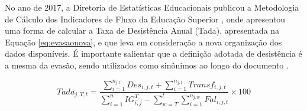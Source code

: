 \documentclass[a4paper]{article}
\begin{document}




No ano de 2017, a Diretoria de Estatísticas Educacionais publicou a Metodologia de Cálculo
dos Indicadores de Fluxo da Educação Superior , onde apresentou uma  forma de calcular a Taxa de Desistência Anual (Tada), apresentada na Equação \ref{eq:evasaonova}, e que leva em consideração a nova organização dos dados disponíveis. É importante salientar que a definição adotada de desistência é a mesma da evasão, sendo utilizados como sinônimos ao longo do documento \cite{dados:2017}.

\begin{equation}\label{eq:evasaonova}
{Tada_{j,T,t}} = \frac{\sum_{i=1}^{n_{j,t}} Des_{i,j,t} + \sum_{i=1}^{n_{j,t}} Transf_{i,j,t}} {\sum_{i=1}^{n} IG^T_{i,j} - \sum_{w=T}^{t} \sum_{i=1}^{n_{j,w}} Fal_{i,j,t}} \times{100}
\end{equation}
\end{document}
